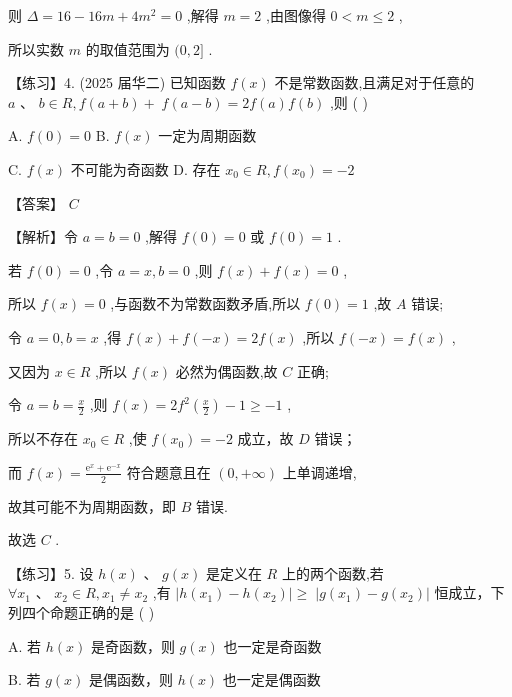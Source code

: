 \documentclass[10pt]{article}
\begin{document}
则 \(\Delta  = {16} - {16m} + 4{m}^{2} = 0\) ,解得 \(m = 2\) ,由图像得 \(0 < m \leq  2\) ,

所以实数 \(m\) 的取值范围为 \((0,2\rbrack\) .

【练习】4. (2025 届华二) 已知函数 \(f\left( x\right)\) 不是常数函数,且满足对于任意的 \(a\text{ 、 }b \in  R,f\left( {a + b}\right)  + \; f\left( {a - b}\right)  = {2f}\left( a\right) f\left( b\right)\) ,则 ( )

A. \(f\left( 0\right)  = 0\) B. \(f\left( x\right)\) 一定为周期函数

C. \(f\left( x\right)\) 不可能为奇函数 D. 存在 \({x}_{0} \in  R,f\left( {x}_{0}\right)  =  - 2\)

【答案】 \(C\)

【解析】令 \(a = b = 0\) ,解得 \(f\left( 0\right)  = 0\) 或 \(f\left( 0\right)  = 1\) .

若 \(f\left( 0\right)  = 0\) ,令 \(a = x,b = 0\) ,则 \(f\left( x\right)  + f\left( x\right)  = 0\) ,

所以 \(f\left( x\right)  = 0\) ,与函数不为常数函数矛盾,所以 \(f\left( 0\right)  = 1\) ,故 \(A\) 错误;

令 \(a = 0,b = x\) ,得 \(f\left( x\right)  + f\left( {-x}\right)  = {2f}\left( x\right)\) ,所以 \(f\left( {-x}\right)  = f\left( x\right)\) ,

又因为 \(x \in  R\) ,所以 \(f\left( x\right)\) 必然为偶函数,故 \(C\) 正确;

令 \(a = b = \frac{x}{2}\) ,则 \(f\left( x\right)  = 2{f}^{2}\left( \frac{x}{2}\right)  - 1 \geq   - 1\) ,

所以不存在 \({x}_{0} \in  R\) ,使 \(f\left( {x}_{0}\right)  =  - 2\) 成立，故 \(D\) 错误；

而 \(f\left( x\right)  = \frac{{\mathrm{e}}^{x} + {\mathrm{e}}^{-x}}{2}\) 符合题意且在 \(\left( {0, + \infty }\right)\) 上单调递增,

故其可能不为周期函数，即 \(B\) 错误.

故选 \(C\) .

【练习】5. 设 \(h\left( x\right) \text{ 、 }g\left( x\right)\) 是定义在 \(R\) 上的两个函数,若 \(\forall {x}_{1}\text{ 、 }{x}_{2} \in  R,{x}_{1} \neq  {x}_{2}\) ,有 \(\left| {h\left( {x}_{1}\right)  - h\left( {x}_{2}\right) }\right|  \geq \; \left| {g\left( {x}_{1}\right)  - g\left( {x}_{2}\right) }\right|\) 恒成立，下列四个命题正确的是 ( )

A. 若 \(h\left( x\right)\) 是奇函数，则 \(g\left( x\right)\) 也一定是奇函数

B. 若 \(g\left( x\right)\) 是偶函数，则 \(h\left( x\right)\) 也一定是偶函数
\end{document}
